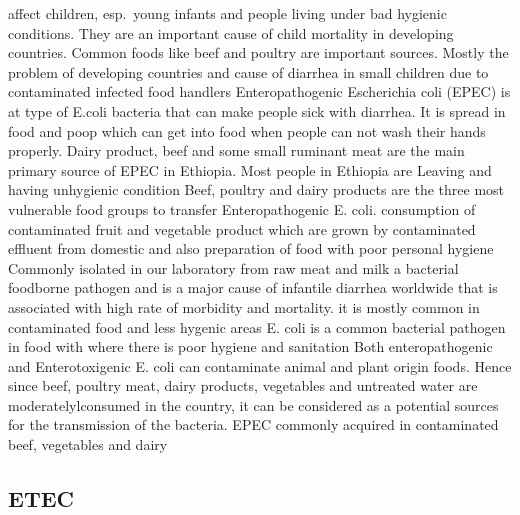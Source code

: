 \documentclass[
  letterpaper,
  DIV=11,
  numbers=noendperiod]{scrartcl}
\begin{document}
affect children, esp.~young infants and people living under bad hygienic
conditions. They are an important cause of child mortality in developing
countries. Common foods like beef and poultry are important sources.
Mostly the problem of developing countries and cause of diarrhea in
small children due to contaminated infected food handlers
Enteropathogenic Escherichia coli (EPEC) is at type of E.coli bacteria
that can make people sick with diarrhea. It is spread in food and poop
which can get into food when people can not wash their hands properly.
Dairy product, beef and some small ruminant meat are the main primary
source of EPEC in Ethiopia. Most people in Ethiopia are Leaving and
having unhygienic condition Beef, poultry and dairy products are the
three most vulnerable food groups to transfer Enteropathogenic E. coli.
consumption of contaminated fruit and vegetable product which are grown
by contaminated effluent from domestic and also preparation of food with
poor personal hygiene Commonly isolated in our laboratory from raw meat
and milk a bacterial foodborne pathogen and is a major cause of
infantile diarrhea worldwide that is associated with high rate of
morbidity and mortality. it is mostly common in contaminated food and
less hygenic areas E. coli is a common bacterial pathogen in food with
where there is poor hygiene and sanitation Both enteropathogenic and
Enterotoxigenic E. coli can contaminate animal and plant origin foods.
Hence since beef, poultry meat, dairy products, vegetables and untreated
water are moderatelylconsumed in the country, it can be considered as a
potential sources for the transmission of the bacteria. EPEC commonly
acquired in contaminated beef, vegetables and dairy

\subsection*{ETEC}\label{etec}
\end{document}
